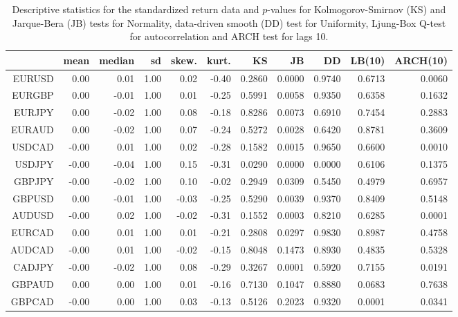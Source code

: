 \begin{table}[ht]
\centering
\begin{tabular}{rrrrrrrrrrr}
  \hline
 & mean & median & sd & skew. & kurt. & KS & JB & DD & LB(10) & ARCH(10) \\ 
  \hline
EURUSD & 0.00 & 0.01 & 1.00 & 0.02 & -0.40 & 0.2860 & 0.0000 & 0.9740 & 0.6713 & 0.0060 \\ 
  EURGBP & 0.00 & -0.01 & 1.00 & 0.01 & -0.25 & 0.5991 & 0.0058 & 0.9350 & 0.6358 & 0.1632 \\ 
  EURJPY & 0.00 & -0.02 & 1.00 & 0.08 & -0.18 & 0.8286 & 0.0073 & 0.6910 & 0.7454 & 0.2883 \\ 
  EURAUD & 0.00 & -0.02 & 1.00 & 0.07 & -0.24 & 0.5272 & 0.0028 & 0.6420 & 0.8781 & 0.3609 \\ 
  USDCAD & -0.00 & 0.01 & 1.00 & 0.02 & -0.28 & 0.1582 & 0.0015 & 0.9650 & 0.6600 & 0.0010 \\ 
  USDJPY & -0.00 & -0.04 & 1.00 & 0.15 & -0.31 & 0.0290 & 0.0000 & 0.0000 & 0.6106 & 0.1375 \\ 
  GBPJPY & -0.00 & -0.02 & 1.00 & 0.10 & -0.02 & 0.2949 & 0.0309 & 0.5450 & 0.4979 & 0.6957 \\ 
  GBPUSD & 0.00 & -0.01 & 1.00 & -0.03 & -0.25 & 0.5290 & 0.0039 & 0.9370 & 0.8409 & 0.5148 \\ 
  AUDUSD & -0.00 & 0.02 & 1.00 & -0.02 & -0.31 & 0.1552 & 0.0003 & 0.8210 & 0.6285 & 0.0001 \\ 
  EURCAD & 0.00 & 0.01 & 1.00 & 0.01 & -0.21 & 0.2808 & 0.0297 & 0.9830 & 0.8987 & 0.4758 \\ 
  AUDCAD & -0.00 & 0.01 & 1.00 & -0.02 & -0.15 & 0.8048 & 0.1473 & 0.8930 & 0.4835 & 0.5328 \\ 
  CADJPY & -0.00 & -0.02 & 1.00 & 0.08 & -0.29 & 0.3267 & 0.0001 & 0.5920 & 0.7155 & 0.0191 \\ 
  GBPAUD & 0.00 & 0.00 & 1.00 & 0.01 & -0.16 & 0.7130 & 0.1047 & 0.8880 & 0.0683 & 0.7638 \\ 
  GBPCAD & -0.00 & 0.00 & 1.00 & 0.03 & -0.13 & 0.5126 & 0.2023 & 0.9320 & 0.0001 & 0.0341 \\ 
   \hline
\end{tabular}
\caption{Descriptive statistics for the standardized return data and
              $p$-values for Kolmogorov-Smirnov (KS) and 
             Jarque-Bera (JB) tests for Normality,
             data-driven smooth (DD) test for Uniformity, 
             Ljung-Box Q-test for autocorrelation and ARCH test for lags 10.} 
\label{table:standrets_desc_FX}
\end{table}
